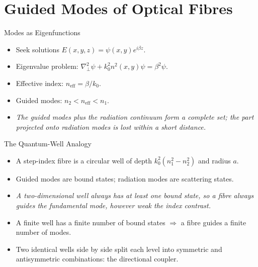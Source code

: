 \documentclass[aspectratio=169,10pt]{beamer}
\begin{document}
\section{Guided Modes of Optical Fibres}
\begin{frame}{Modes as Eigenfunctions}
\begin{itemize}
    \item Seek solutions \(E(x,y,z) = \psi(x,y) e^{i\beta z}\).
    \item Eigenvalue problem: \(\nabla_\perp^2 \psi + k_0^2 n^2(x,y) \psi = \beta^2 \psi\).
    \item Effective index: \(n_{\mathrm{eff}} = \beta / k_0\).
    \item Guided modes: \(n_2 < n_{\mathrm{eff}} < n_1\).
    \item \emph{The guided modes plus the radiation continuum form a complete set; the part projected onto radiation modes is lost within a short distance.}
\end{itemize}
\end{frame}

\begin{frame}{The Quantum-Well Analogy}
\begin{itemize}
    \item A step-index fibre is a circular well of depth \(k_0^2(n_1^2 - n_2^2)\) and radius $a$.
    \item Guided modes are bound states; radiation modes are scattering states.
    \item \emph{A two-dimensional well always has at least one bound state, so a fibre always guides the fundamental mode, however weak the index contrast.}
    \item A finite well has a finite number of bound states \(\Rightarrow\) a fibre guides a finite number of modes.
    \item Two identical wells side by side split each level into symmetric and antisymmetric combinations: the directional coupler.
\end{itemize}
\end{frame}
\end{document}
